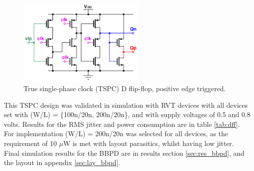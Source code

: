 			\begin{figure}[htb!]
			        \centering
			        \includegraphics[width=0.55\textwidth, angle=0]{./figs/design/tspc_}
			    \caption{True single-phase clock (TSPC) D flip-flop, positive edge triggered.}
			    \label{fig:tspc_dff}
			\end{figure}

		This TSPC design was validated in simulation with RVT devices with all devices set with (W/L) = \{100n/20n, 200n/20n\}, and with supply voltages of 0.5 and 0.8 volts. Results for the RMS jitter and power consumption are in table \ref{tab:dff}. For implementation (W/L) = 200n/20n was selected for all devices, as the requirement of 10 $\mu$W is met with layout parasitics, whilst having low jitter. Final simulation results for the BBPD are in results section \ref{sec:res_bbpd}, and the layout in appendix \ref{sec:lay_bbpd}.





